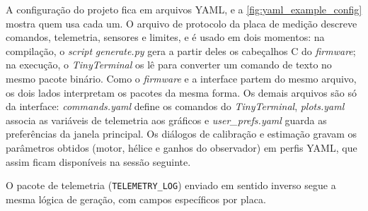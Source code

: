 A configuração do projeto fica em arquivos YAML, e a
\autoref{fig:yaml_example_config} mostra quem usa cada um. O arquivo de
protocolo da placa de medição descreve comandos, telemetria, sensores e
limites, e é usado em dois momentos: na compilação, o \textit{script} \textit{generate.py}
gera a partir deles os cabeçalhos C do \textit{firmware}; na execução, o
\textit{TinyTerminal} os lê para converter um comando de texto no mesmo
pacote binário. Como o \textit{firmware} e a interface partem do mesmo arquivo,
os dois lados interpretam os pacotes da mesma forma. Os demais arquivos são só
da interface: \textit{commands.yaml} define os comandos do
\textit{TinyTerminal}, \textit{plots.yaml} associa as variáveis de telemetria
aos gráficos e \textit{user\_prefs.yaml} guarda as preferências da janela
principal. Os diálogos de calibração e estimação gravam os parâmetros
obtidos (motor, hélice e ganhos do observador) em perfis YAML, que assim ficam
disponíveis na sessão seguinte.

O pacote de telemetria (\texttt{TELEMETRY\_LOG}) enviado em sentido inverso
segue a mesma lógica de geração, com campos específicos por placa.

